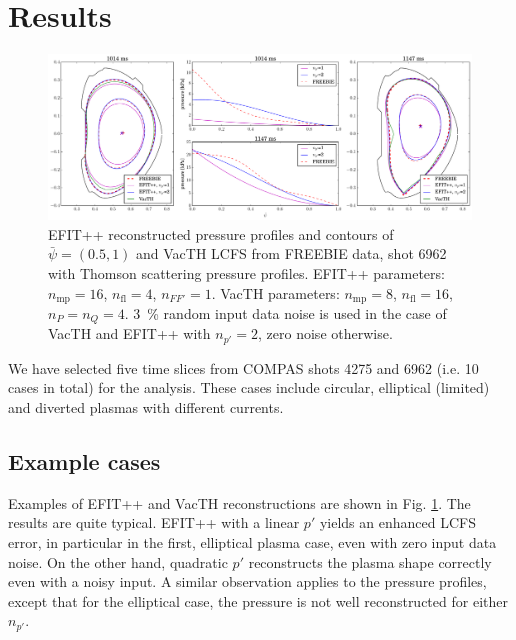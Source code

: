 
\section{Results} %
\label{sec:results}

\begin{figure}[!htb]
\centering   %
\hfill{}
\includegraphics[width=17.5cm]{example_6962.pdf}
\hfill{}
\caption{EFIT++ reconstructed pressure profiles and contours of $\bar\psi=\left(0.5,1\right)$ and VacTH LCFS from FREEBIE data, shot 6962 with Thomson scattering pressure profiles. EFIT++ parameters: $n_\mathrm{mp} = 16$, $n_\mathrm{fl} = 4$, $n_{FF'} = 1$. VacTH parameters: $n_\mathrm{mp} = 8$, $n_\mathrm{fl} = 16$, $n_P = n_Q = 4$. 3~\% random input data noise is used in the case of VacTH and EFIT++ with $n_{p'} = 2$, zero noise otherwise.}
\label{fig:ex6962}
\end{figure}


We have selected five time slices from COMPAS shots 4275 and 6962 (i.e. 10 cases in total) for the analysis. These cases include circular, elliptical (limited) and diverted plasmas with different currents. 

\subsection{Example cases}

Examples of EFIT++ and VacTH reconstructions are shown in Fig. \ref{fig:ex6962}. The results are quite typical. EFIT++ with a linear $p'$ yields an enhanced LCFS error, in particular in the first, elliptical plasma case, even with zero input data noise. On the other hand, quadratic $p'$ reconstructs the plasma shape correctly even with a noisy input. A similar observation applies to the pressure profiles, except that for the elliptical case, the pressure is not well reconstructed for either $n_{p'}$. 

